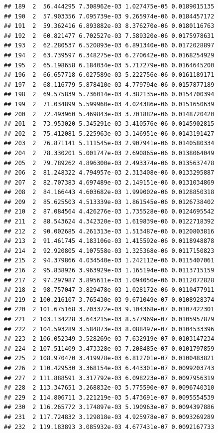 \documentclass[article]{jss}\usepackage[]{graphicx}\usepackage[]{xcolor}
\makeatletter
\newenvironment{kframe}{%
 \def\at@end@of@kframe{}%
 \ifinner\ifhmode%
  \def\at@end@of@kframe{\end{minipage}}%
  \begin{minipage}{\columnwidth}%
 \fi\fi%
 \def\FrameCommand##1{\hskip\@totalleftmargin \hskip-\fboxsep
 \colorbox{shadecolor}{##1}\hskip-\fboxsep
     \hskip-\linewidth \hskip-\@totalleftmargin \hskip\columnwidth}%
 \MakeFramed {\advance\hsize-\width
   \@totalleftmargin\z@ \linewidth\hsize
   \@setminipage}}%
 {\par\unskip\endMakeFramed%
 \at@end@of@kframe}
\newenvironment{knitrout}{}{} %
\makeatother
\begin{document}
\begin{knitrout}
\begin{kframe}
\begin{verbatim}
## 189  2  56.444295 7.308962e-03 1.027475e-05 0.0189015135
## 190  2  57.903356 7.095739e-03 9.265974e-06 0.0184457172
## 191  2  59.362416 6.893882e-03 8.376270e-06 0.0180116763
## 192  2  60.821477 6.702527e-03 7.589320e-06 0.0175978631
## 193  2  62.280537 6.520893e-03 6.891340e-06 0.0172028897
## 194  2  63.739597 6.348275e-03 6.270642e-06 0.0168254929
## 195  2  65.198658 6.184034e-03 5.717279e-06 0.0164645200
## 196  2  66.657718 6.027589e-03 5.222756e-06 0.0161189171
## 197  2  68.116779 5.878410e-03 4.779794e-06 0.0157877189
## 198  2  69.575839 5.736014e-03 4.382135e-06 0.0154700394
## 199  2  71.034899 5.599960e-03 4.024386e-06 0.0151650639
## 200  2  72.493960 5.469843e-03 3.701882e-06 0.0148720420
## 201  2  73.953020 5.345291e-03 3.410576e-06 0.0145902815
## 202  2  75.412081 5.225963e-03 3.146951e-06 0.0143191427
## 203  2  76.871141 5.111545e-03 2.907941e-06 0.0140580334
## 204  2  78.330201 5.001747e-03 2.690865e-06 0.0138064049
## 205  2  79.789262 4.896300e-03 2.493374e-06 0.0135637478
## 206  2  81.248322 4.794957e-03 2.313408e-06 0.0133295887
## 207  2  82.707383 4.697489e-03 2.149151e-06 0.0131034869
## 208  2  84.166443 4.603682e-03 1.999002e-06 0.0128850318
## 209  2  85.625503 4.513339e-03 1.861545e-06 0.0126738402
## 210  2  87.084564 4.426276e-03 1.735528e-06 0.0124695542
## 211  2  88.543624 4.342320e-03 1.619839e-06 0.0122718392
## 212  2  90.002685 4.261313e-03 1.513487e-06 0.0120803816
## 213  2  91.461745 4.183106e-03 1.415592e-06 0.0118948878
## 214  2  92.920805 4.107558e-03 1.325368e-06 0.0117150823
## 215  2  94.379866 4.034540e-03 1.242112e-06 0.0115407061
## 216  2  95.838926 3.963929e-03 1.165194e-06 0.0113715159
## 217  2  97.297987 3.895611e-03 1.094050e-06 0.0112072828
## 218  2  98.757047 3.829478e-03 1.028172e-06 0.0110477911
## 219  2 100.216107 3.765430e-03 9.671049e-07 0.0108928374
## 220  2 101.675168 3.703372e-03 9.104368e-07 0.0107422301
## 221  2 103.134228 3.643215e-03 8.577969e-07 0.0105957879
## 222  2 104.593289 3.584873e-03 8.088497e-07 0.0104533396
## 223  2 106.052349 3.528269e-03 7.632919e-07 0.0103147234
## 224  2 107.511409 3.473328e-03 7.208485e-07 0.0101797859
## 225  2 108.970470 3.419978e-03 6.812701e-07 0.0100483821
## 226  2 110.429530 3.368154e-03 6.443301e-07 0.0099203743
## 227  2 111.888591 3.317792e-03 6.098223e-07 0.0097956319
## 228  2 113.347651 3.268832e-03 5.775590e-07 0.0096740310
## 229  2 114.806711 3.221219e-03 5.473691e-07 0.0095554539
## 230  2 116.265772 3.174897e-03 5.190963e-07 0.0094397886
## 231  2 117.724832 3.129818e-03 4.925978e-07 0.0093269289
## 232  2 119.183893 3.085932e-03 4.677431e-07 0.0092167733

\end{verbatim}
\end{kframe}
\end{knitrout}
\end{document}
